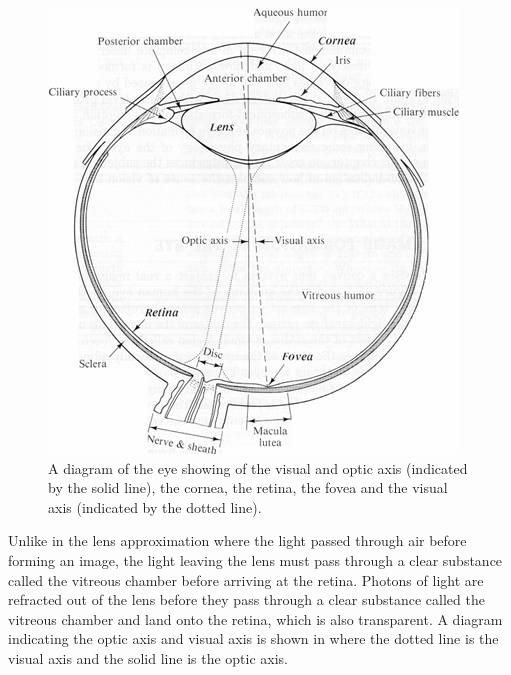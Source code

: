 \begin{figure}[H]
\centering
  \includegraphics{figures/eye_diagram}
\caption{A diagram of the eye showing of the visual
 	     and optic axis (indicated by the solid line), the \gls{cornea}, the retina, the fovea
              and the visual axis (indicated by the dotted line).}
\label{fig:optic_axis}
\end{figure}

Unlike in the lens approximation where the light passed through air before forming an
image, the light leaving the lens must pass through a clear substance called the
vitreous chamber before arriving at the retina. Photons of light are refracted out of the
lens before they pass through a clear substance called the vitreous chamber and land
onto the retina, which is also transparent. A diagram indicating the optic axis and
visual axis is shown in  where the dotted line is the visual axis and
the solid line is the optic axis.

